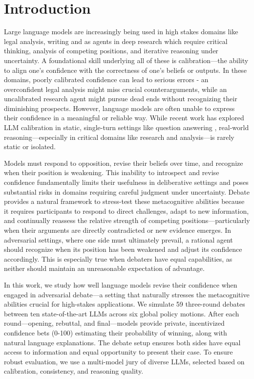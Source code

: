 \documentclass{article}
\begin{document}
\section{Introduction}
Large language models are increasingly being used in high stakes domains like legal analysis, writing and as agents in deep research \cite{handa2025economictasksperformedai} \cite{zheng2025deepresearcherscalingdeepresearch} which require critical thinking, analysis of competing positions, and iterative reasoning under uncertainty. A foundational skill underlying all of these is calibration—the ability to align one's confidence with the correctness of one's beliefs or outputs. In these domains, poorly calibrated confidence can lead to serious errors - an overconfident legal analysis might miss crucial counterarguments, while an uncalibrated research agent might pursue dead ends without recognizing their diminishing prospects. However, language models are often unable to express their confidence in a meaningful or reliable way. While recent work has explored LLM calibration in static, single-turn settings like question answering \citep{tian2023justask, xiong2024uncertainty, kadavath2022know}, real-world reasoning—especially in critical domains like research and analysis—is rarely static or isolated.

Models must respond to opposition, revise their beliefs over time, and recognize when their position is weakening. This inability to introspect and revise confidence fundamentally limits their usefulness in deliberative settings and poses substantial risks in domains requiring careful judgment under uncertainty. Debate provides a natural framework to stress-test these metacognitive abilities because it requires participants to respond to direct challenges, adapt to new information, and continually reassess the relative strength of competing positions—particularly when their arguments are directly contradicted or new evidence emerges. In adversarial settings, where one side must ultimately prevail, a rational agent should recognize when its position has been weakened and adjust its confidence accordingly. This is especially true when debaters have equal capabilities, as neither should maintain an unreasonable expectation of advantage.

In this work, we study how well language models revise their confidence when engaged in adversarial debate—a setting that naturally stresses the metacognitive abilities crucial for high-stakes applications. We simulate 59 three-round debates between ten state-of-the-art LLMs across six global policy motions. After each round—opening, rebuttal, and final—models provide private, incentivized confidence bets (0-100) estimating their probability of winning, along with natural language explanations. The debate setup ensures both sides have equal access to information and equal opportunity to present their case. To ensure robust evaluation, we use a multi-model jury of diverse LLMs, selected based on calibration, consistency, and reasoning quality.
\end{document}
